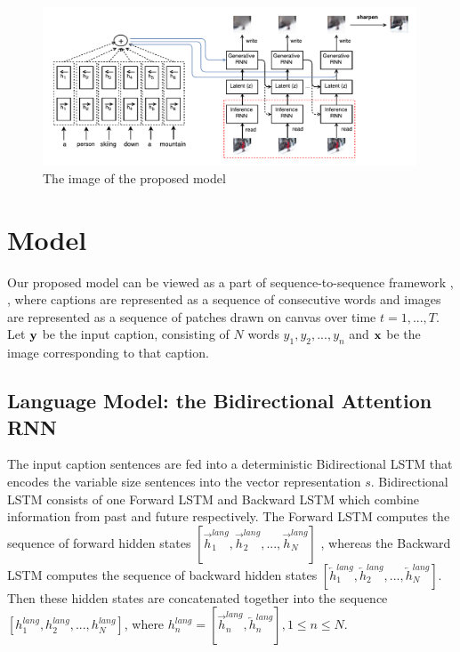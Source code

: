 \documentclass{article} %
\newcommand{\hlang}{h^{lang}}
\newcommand{\icaption}{{\bf{y}}}
\newcommand{\oimage}{{\bf{x}}}
\begin{document}
\begin{figure}[!t]
\captionsetup[subfigure]{labelformat=empty}
\begin{center}
\includegraphics[width=0.99\textwidth]{figures/alignDraw-cropped.pdf}\quad
%
\end{center}
\caption{The image of the proposed model}
\label{fig:figmodel}
\vspace{-0.3cm}
\end{figure}

\section{Model}
Our proposed model can be viewed as a part of sequence-to-sequence framework \citep{ilya_mt}, \citep{cho_mt}, \citep{nitish_video} where captions are represented as a sequence of consecutive words and images are represented as a sequence of patches drawn on canvas over time $t=1,...,T$. Let $\icaption$ be the input caption, consisting of $N$ words $y_{1}, y_{2}, ..., y_{n}$ and $\oimage$ be the image corresponding to that caption.

\subsection{Language Model: the Bidirectional Attention RNN}
\label{sec:lang}
The input caption sentences are fed into a deterministic Bidirectional LSTM\cite{} that encodes the variable size sentences into the vector representation $s$. Bidirectional LSTM consists of one Forward LSTM and Backward LSTM which combine information from past and future respectively. The Forward LSTM computes the sequence of forward hidden states $[\overrightarrow{h}^{lang}_{1}, \overrightarrow{h}^{lang}_{2}, ..., \overrightarrow{h}^{lang}_{N}]$ , whereas the Backward LSTM computes the sequence of backward hidden states $[\overleftarrow{h}^{lang}_{1}, \overleftarrow{h}^{lang}_{2}, ..., \overleftarrow{h}^{lang}_{N}]$. Then these hidden states are concatenated together into the sequence $[\hlang_{1}, \hlang_{2}, ..., \hlang_{N}]$, where $\hlang_{n} = [\overrightarrow{h}^{lang}_{n}, \overleftarrow{h}^{lang}_{n}], 1\leq n\leq N$.
\end{document}
